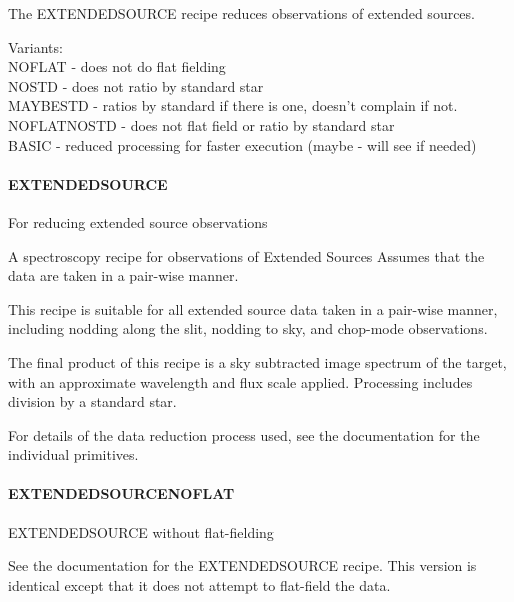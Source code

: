 \documentclass[twoside,11pt]{article}
\renewcommand{\_}{\texttt{\symbol{95}}}
\begin{document}
The EXTENDED\_SOURCE recipe reduces observations of extended sources.

Variants: \\
\_NOFLAT - does not do flat fielding \\
\_NOSTD - does not ratio by standard star \\
\_MAYBESTD - ratios by standard if there is one, doesn't complain if not. \\
\_NOFLAT\_NOSTD - does not flat field or ratio by standard star \\
\_BASIC - reduced processing for faster execution (maybe - will see if needed) \\

\paragraph{EXTENDED\_SOURCE\label{EXTENDED_SOURCE}}


For reducing extended source observations


\mbox{}


A spectroscopy recipe for observations of Extended Sources
Assumes that the data are taken in a pair-wise manner.



This recipe is suitable for all extended source data taken in a pair-wise
manner, including nodding along the slit, nodding to sky, and
chop-mode observations.



The final product of this recipe is a sky subtracted image spectrum of
the target, with an approximate wavelength and flux scale
applied. Processing includes division by a standard star.



For details of the data reduction process used, see the documentation
for the individual primitives.

\paragraph{EXTENDED\_SOURCE\_NOFLAT\label{EXTENDED_SOURCE_NOFLAT}}


EXTENDED\_SOURCE without flat-fielding


\mbox{}


See the documentation for the EXTENDED\_SOURCE recipe. This version is
identical except that it does not attempt to flat-field the data.
\end{document}
